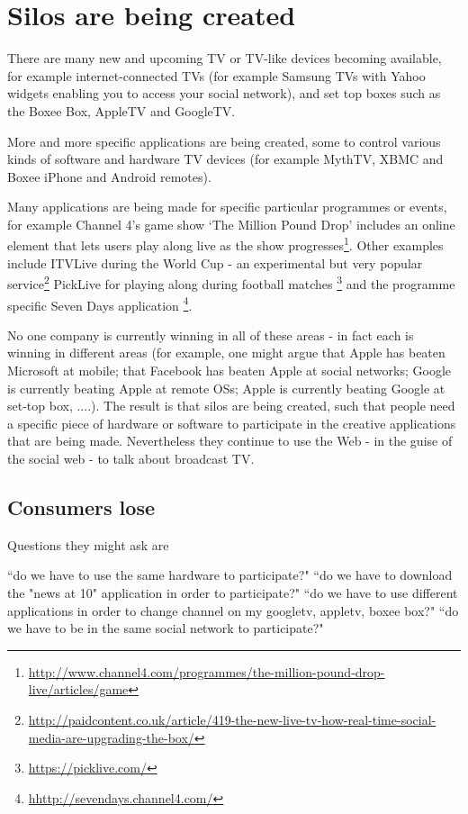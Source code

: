 \documentclass[]{article}%
\begin{document}
\section{Silos are being created}

There are many new and upcoming TV or TV-like devices becoming available, for example internet-connected TVs (for example Samsung TVs with Yahoo widgets enabling you to access your social network), and set top boxes such as the Boxee Box, AppleTV and GoogleTV. 

More and more specific applications are being created, some to control various kinds of software and hardware TV devices (for example MythTV, XBMC and Boxee iPhone and Android remotes). 

Many applications are being made for specific particular programmes or events, for example Channel 4's game show `The Million Pound Drop' includes an online element that lets users play along live as the show progresses\footnote{\url{http://www.channel4.com/programmes/the-million-pound-drop-live/articles/game}}. Other examples include ITVLive during the World Cup - an experimental but very popular service\footnote{\url{http://paidcontent.co.uk/article/419-the-new-live-tv-how-real-time-social-media-are-upgrading-the-box/}} PickLive for playing along during football matches \footnote{\url{https://picklive.com/}} and the programme specific Seven Days application \footnote{\url{hhttp://sevendays.channel4.com/}}.

No one company is currently winning in all of these areas - in fact each is winning in different areas (for example, one might argue that Apple has beaten Microsoft at mobile; that Facebook has beaten Apple at social networks; Google is currently beating Apple at remote OSs; Apple is currently beating Google at set-top box, ....). The result is that silos are being created, such that people need a specific piece of hardware or software to participate in the creative applications that are being made. Nevertheless they continue to use the Web - in the guise of the social web - to talk about broadcast TV. 

\subsection{Consumers lose}

Questions they might ask are

``do we have to use the same hardware to participate?"
``do we have to download the "news at 10" application in order to participate?"
``do we have to use different applications in order to change channel on my googletv, appletv, boxee box?"
``do we have to be in the same social network to participate?"
\end{document}
